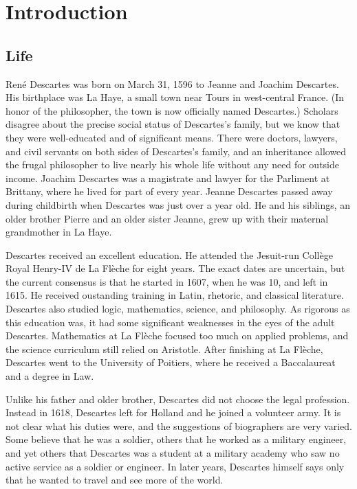 \chapter{Introduction}

\section*{Life}

René Descartes was born on March 31, 1596 to Jeanne and Joachim Descartes. His birthplace was La Haye, a small town near Tours in west-central France. (In honor of the philosopher, the town is now officially named Descartes.) Scholars disagree about the precise social status of Descartes's family, but we know that they were well-educated and of significant means. There were doctors, lawyers, and civil servants on both sides of Descartes's family, and an inheritance allowed the frugal philosopher to live nearly his whole life without any need for outside income. Joachim Descartes was a magistrate and lawyer for the Parliment at Brittany, where he lived for part of every year. Jeanne Descartes passed away during childbirth when Descartes was just over a year old. He and his siblings, an older brother Pierre and an older sister Jeanne, grew up with their maternal grandmother in La Haye.

Descartes received an excellent education. He attended the Jesuit-run Collège Royal Henry-IV de La Flèche for eight years. The exact dates are uncertain, but the current consensus is that he started in 1607, when he was 10, and left in 1615. He received oustanding training in Latin, rhetoric, and classical literature. Descartes also studied logic, mathematics, science, and philosophy. As rigorous as this education was, it had some significant weaknesses in the eyes of the adult Descartes. Mathematics at La Flèche focused too much on applied problems, and the science curriculum still relied on Aristotle. After finishing at La Flèche, Descartes went to the University of Poitiers, where he received a Baccalaureat and a degree in Law.

Unlike his father and older brother, Descartes did not choose the legal profession. Instead in 1618, Descartes left for Holland and he joined a volunteer army. It is not clear what his duties were, and the suggestions of biographers are very varied. Some believe that he was a soldier, others that he worked as a military engineer, and yet others that Descartes was a student at a military academy who saw no active service as a soldier or engineer. In later years, Descartes himself says only that he wanted to travel and see more of the world.

